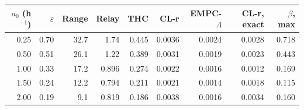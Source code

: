 \begin{tabular}{rrrrrrrrr}
\toprule
$a_0$ (h$^{-1}$) & $\varepsilon$ & Range & Relay & THC & CL-r & EMPC-$\Lambda$ & CL-r, exact & $\beta$, max\\
\midrule
0.25 & 0.70 & 32.7 & 1.74 & 0.445 & 0.0036 & 0.0024 & 0.0028 & 0.718\\
0.50 & 0.51 & 26.1 & 1.22 & 0.389 & 0.0031 & 0.0019 & 0.0023 & 0.443\\
1.00 & 0.33 & 17.2 & 0.896 & 0.274 & 0.0022 & 0.0016 & 0.0012 & 0.169\\
1.50 & 0.24 & 12.2 & 0.794 & 0.211 & 0.0021 & 0.0014 & 0.0018 & 0.115\\
2.00 & 0.19 & 9.1 & 0.819 & 0.186 & 0.0038 & 0.0016 & 0.0034 & 0.160\\
\bottomrule
\end{tabular}
